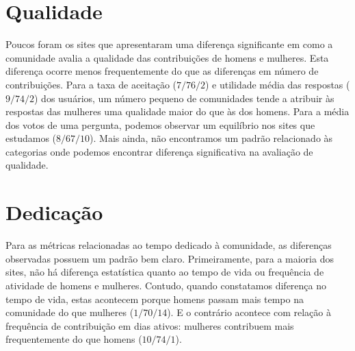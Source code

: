 \section{Qualidade} %
\label{subsec:qualidade}

Poucos foram os sites que apresentaram uma diferença significante em como a comunidade avalia a qualidade das contribuições de homens e mulheres. Esta diferença ocorre menos frequentemente do que as diferenças em número de contribuições. Para a taxa de aceitação ($7/76/2$) e utilidade média das respostas ($9/74/2$) dos usuários, um número pequeno de comunidades tende a atribuir às respostas das mulheres uma qualidade maior do que às dos homens. Para a média dos votos de uma pergunta, podemos observar um equilíbrio nos sites que estudamos ($8/67/10$). Mais ainda, não encontramos um padrão relacionado às categorias onde podemos encontrar diferença significativa na avaliação de qualidade.




\section{Dedicação}%

Para as métricas relacionadas ao tempo dedicado à comunidade, as diferenças observadas possuem um padrão bem claro. Primeiramente, para a maioria dos sites, não há diferença estatística quanto ao tempo de vida ou frequência de atividade de homens e mulheres. Contudo, quando constatamos diferença no tempo de vida, estas acontecem porque homens passam mais tempo na comunidade do que mulheres ($1/70/14$). E o contrário acontece com relação à frequência de contribuição em dias ativos: mulheres contribuem mais frequentemente do que homens ($10/74/1$).


